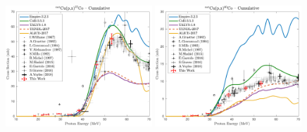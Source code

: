 \begin{figure}
  \includegraphics[width=0.49\textwidth]{./figures/57Co_cum.pdf}
 \includegraphics[width=0.49\textwidth]{./figures/60Co.pdf}

\vspace{-20pt} 
\end{figure}

